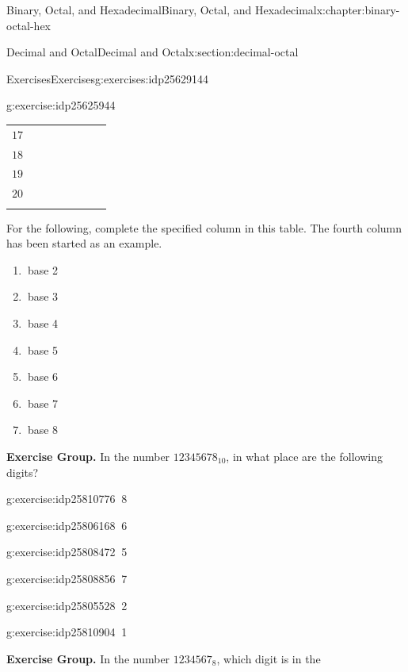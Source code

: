 \documentclass[twoside,10pt,]{book}
\numberwithin{equation}{section}
\newcommand{\hrulethin}  {\noalign{\hrule height 0.04em}}
\newcommand{\hrulethick} {\noalign{\hrule height 0.11em}}
\begin{document}
\begin{chapterptx}{Binary, Octal, and Hexadecimal}{}{Binary, Octal, and Hexadecimal}{}{}{x:chapter:binary-octal-hex}
\begin{sectionptx}{Decimal and Octal}{}{Decimal and Octal}{}{}{x:section:decimal-octal}
\begin{exercises-subsection}{Exercises}{}{Exercises}{}{}{g:exercises:idp25629144}
\begin{divisionexercise}{1}{}{}{g:exercise:idp25625944}
\begin{center}
{\begin{tabular}{cccccccc}
\(17\)&&&&&&&\tabularnewline\hrulethin
\(18\)&&&&&&&\tabularnewline\hrulethin
\(19\)&&&&&&&\tabularnewline\hrulethin
\(20\)&&&&&&&\tabularnewline\hrulethick
\end{tabular}
}%
\end{center}%
 For the following, complete the specified column in this table.  The fourth column has been started as an example.%
%
\begin{enumerate}[label=(\alph*)]
\item{}\(\ \)base 2%
\item{}\(\ \)base 3%
\item{}\(\ \)base 4%
\item{}\(\ \)base 5%
\item{}\(\ \)base 6%
\item{}\(\ \)base 7%
\item{}\(\ \)base 8%
\end{enumerate}
\end{divisionexercise}%
\par\medskip\noindent%
\textbf{Exercise Group.}\space\space%
In the number \(12345678_{10}\), in what place are the following digits?%
\begin{exercisegroup}
\begin{divisionexerciseeg}{2}{}{}{g:exercise:idp25810776}%
\(\ \)8\end{divisionexerciseeg}%
\begin{divisionexerciseeg}{3}{}{}{g:exercise:idp25806168}%
\(\ \)6\end{divisionexerciseeg}%
\begin{divisionexerciseeg}{4}{}{}{g:exercise:idp25808472}%
\(\ \)5\end{divisionexerciseeg}%
\begin{divisionexerciseeg}{5}{}{}{g:exercise:idp25808856}%
\(\ \)7\end{divisionexerciseeg}%
\begin{divisionexerciseeg}{6}{}{}{g:exercise:idp25805528}%
\(\ \)2\end{divisionexerciseeg}%
\begin{divisionexerciseeg}{7}{}{}{g:exercise:idp25810904}%
\(\ \)1\end{divisionexerciseeg}%
\end{exercisegroup}
\par\medskip\noindent
\par\medskip\noindent%
\textbf{Exercise Group.}\space\space%
In the number \(1234567_8\), which digit is in the%
\begin{exercisegroup}

\end{exercisegroup}
\end{exercises-subsection}
\end{sectionptx}
\end{chapterptx}
\end{document}
